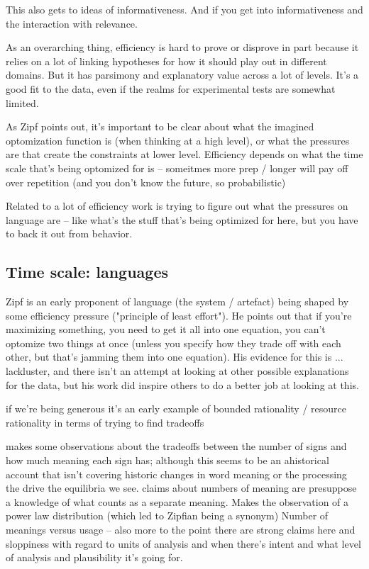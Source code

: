 \documentclass[]{article}
\begin{document}
This also gets to ideas of informativeness. And if you get into informativeness and the interaction with relevance. 


As an overarching thing, efficiency is hard to prove or disprove in part because it relies on a lot of linking hypotheses for how it should play out in different domains. But it has parsimony and explanatory value across a lot of levels. It's a good fit to the data, even if the realms for experimental tests are somewhat limited. 

As Zipf points out, it's important to be clear about what the imagined optomization function is (when thinking at a high level), or what the pressures are that create the constraints at lower level. Efficiency depends on what the time scale that's being optomized for is -- someitmes more prep / longer will pay off over repetition (and you don't know the future, so probabilistic)

Related to a lot of efficiency work is trying to figure out what the pressures on language are -- like what's the stuff that's being optimized for here, but you have to back it out from behavior. 

\subsection{Time scale: languages}

Zipf is an early proponent of language (the system / artefact) being shaped by some efficiency pressure ("principle of least effort"). He points out that if you're maximizing something, you need to get it all into one equation, you can't optomize two things at once (unless you specify how they trade off with each other, but that's jamming them into one equation). His evidence for this is ... lackluster, and there isn't an attempt at looking at other possible explanations for the data, but his work did inspire others to do a better job at looking at this. 

\cite{zipf1949} if we're being generous it's an early example of bounded rationality / resource rationality in terms of trying to find tradeoffs 

\cite{zipf1949} makes some observations about the tradeoffs between the number of signs and how much meaning each sign has; although this seems to be an ahistorical account that isn't covering historic changes in word meaning or the processing the drive the equilibria we see. claims about numbers of meaning are presuppose a knowledge of what counts as a separate meaning. Makes the observation of a power law distribution (which led to Zipfian being a synonym) Number of meanings versus usage -- also more to the point there are strong claims here and sloppiness with regard to units of analysis and when there's intent and what level of analysis and plausibility it's going for. 
\end{document}
